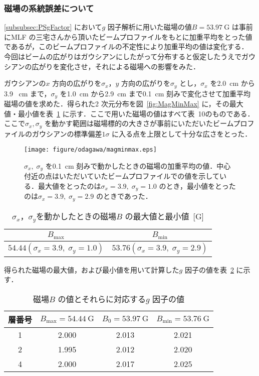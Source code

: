 \subsubsection{磁場の系統誤差について}
\label{subsubsec:MagSysErr}

\ref{subsubsec:PSgFactor} において$g$ 因子解析に用いた磁場の値$B = 53.97~\mathrm{G}$ は事前にMLF の三宅さんから頂いたビームプロファイルをもとに加重平均をとった値であるが，このビームプロファイルの不定性により加重平均の値は変化する．
今回はビームの広がりはガウシアンにしたがって分布すると仮定したうえでガウシアンの広がりを変化させ，それによる磁場への影響をみた．

ガウシアンの$x$ 方向の広がりを$\sigma_{x}$，$y$ 方向の広がりを$\sigma_{y}$ とし，$\sigma_{x}$ を2.0~cm から3.9 ~cm まで，$\sigma_{y}$ を1.0~cm から2.9~cm まで0.1~cm 刻みで変化させて加重平均磁場の値を求めた．得られた2 次元分布を図~\ref{fig:MagMinMax} に，その最大値・最小値を表~\ref{tab:MagSysErr} に示す．ここで用いた磁場の値はすべて表~10のものである．
ここで$\sigma_{x}, \sigma_{y}$ を動かす範囲は磁場標的の大きさが事前にいただいたビームプロファイルのガウシアンの標準偏差$1\sigma$ に入る点を上限として十分な広さをとった．
\begin{figure}[h]
	\centering
	\texttt{[image: figure/odagawa/magminmax.eps]}
	\caption{$\sigma_{x}, \;\sigma_{y}$ を0.1~cm 刻みで動かしたときの磁場の加重平均の値．中心付近の点はいただいていたビームプロファイルでの値を示している．最大値をとったのは$\sigma_{x} = 3.9, \;\sigma_{y} = 1.0$ のとき，最小値をとったのは$\sigma_{x} = 3.9, \;\sigma_{y} = 2.9$ のときであった．}
	\label{fig:PSMagMinMax}
\end{figure}
\begin{table}[h]
	\centering
	\caption{$\sigma_{x}$，$\sigma_{y}$を動かしたときの磁場$B$ の最大値と最小値~[G]}
	\begin{tabular}{cc}\toprule
	$B_{\mathrm{max}}$ & $B_{\mathrm{min}}$ \\ \midrule
	$54.44 (\sigma_{x} = 3.9, \;\sigma_{y} = 1.0)$ & $53.76 (\sigma_{x} = 3.9, \;\sigma_{y} = 2.9)$ \\ \bottomrule 	
	\end{tabular}\label{tab:MagSysErr}
\end{table}%

得られた磁場の最大値，および最小値を用いて計算した$g$ 因子の値を表~\ref{tab:PSgSysErr} に示す．
\begin{table}[h]
	\centering
	\caption{磁場$B$ の値とそれらに対応する$g$ 因子の値}
	\begin{tabular}{cccc}\toprule
	層番号 & $B_{\mathrm{max}} = 54.44~\mathrm{G}$ & $B_{0} = 53.97~\mathrm{G}$ & $B_{\mathrm{min}} = 53.76~\mathrm{G}$ \\ \midrule
	1 & 2.000 & 2.013 & 2.021 \\
	2 & 1.995 & 2.012 & 2.020 \\
	4 & 2.000 & 2.017 & 2.025 \\ \bottomrule 
	\end{tabular}\label{tab:PSgSysErr}
\end{table}%

